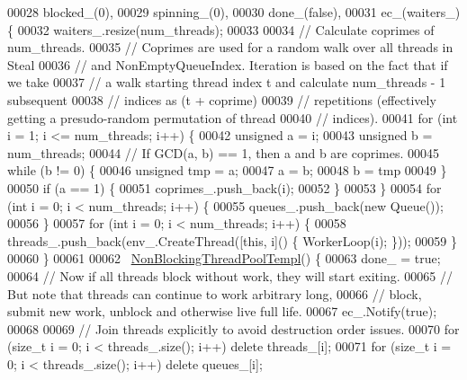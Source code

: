 \begin{DoxyCode}
00028         blocked\_(0),
00029         spinning\_(0),
00030         done\_(\textcolor{keyword}{false}),
00031         ec\_(waiters\_) \{
00032     waiters\_.resize(num\_threads);
00033 
00034     \textcolor{comment}{// Calculate coprimes of num\_threads.}
00035     \textcolor{comment}{// Coprimes are used for a random walk over all threads in Steal}
00036     \textcolor{comment}{// and NonEmptyQueueIndex. Iteration is based on the fact that if we take}
00037     \textcolor{comment}{// a walk starting thread index t and calculate num\_threads - 1 subsequent}
00038     \textcolor{comment}{// indices as (t + coprime) %
00039     \textcolor{comment}{// repetitions (effectively getting a presudo-random permutation of thread}
00040     \textcolor{comment}{// indices).}
00041     \textcolor{keywordflow}{for} (\textcolor{keywordtype}{int} i = 1; i <= num\_threads; i++) \{
00042       \textcolor{keywordtype}{unsigned} a = i;
00043       \textcolor{keywordtype}{unsigned} b = num\_threads;
00044       \textcolor{comment}{// If GCD(a, b) == 1, then a and b are coprimes.}
00045       \textcolor{keywordflow}{while} (b != 0) \{
00046         \textcolor{keywordtype}{unsigned} tmp = a;
00047         a = b;
00048         b = tmp %
00049       \}
00050       \textcolor{keywordflow}{if} (a == 1) \{
00051         coprimes\_.push\_back(i);
00052       \}
00053     \}
00054     \textcolor{keywordflow}{for} (\textcolor{keywordtype}{int} i = 0; i < num\_threads; i++) \{
00055       queues\_.push\_back(\textcolor{keyword}{new} Queue());
00056     \}
00057     \textcolor{keywordflow}{for} (\textcolor{keywordtype}{int} i = 0; i < num\_threads; i++) \{
00058       threads\_.push\_back(env\_.CreateThread([\textcolor{keyword}{this}, i]() \{ WorkerLoop(i); \}));
00059     \}
00060   \}
00061 
00062   ~\hyperlink{class_eigen_1_1_non_blocking_thread_pool_templ}{NonBlockingThreadPoolTempl}() \{
00063     done\_ = \textcolor{keyword}{true};
00064     \textcolor{comment}{// Now if all threads block without work, they will start exiting.}
00065     \textcolor{comment}{// But note that threads can continue to work arbitrary long,}
00066     \textcolor{comment}{// block, submit new work, unblock and otherwise live full life.}
00067     ec\_.Notify(\textcolor{keyword}{true});
00068 
00069     \textcolor{comment}{// Join threads explicitly to avoid destruction order issues.}
00070     \textcolor{keywordflow}{for} (\textcolor{keywordtype}{size\_t} i = 0; i < threads\_.size(); i++) \textcolor{keyword}{delete} threads\_[i];
00071     \textcolor{keywordflow}{for} (\textcolor{keywordtype}{size\_t} i = 0; i < threads\_.size(); i++) \textcolor{keyword}{delete} queues\_[i];
}
\end{DoxyCode}
